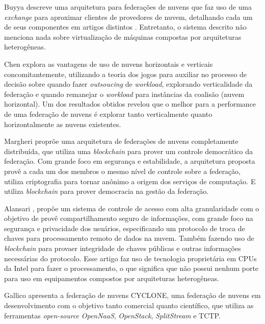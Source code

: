 
Buyya \cite{Buyya:2010:IUF:2143583.2143586} descreve uma arquitetura para federações de nuvens que faz uso de uma \textit{exchange} para aproximar clientes de provedores de nuvem, detalhando cada um de seus componentes em artigos distintos \cite{Calheiros:2012:CSE:2263483.2264538}\cite{Garg2013} \cite{4539666} \cite{6063003}. Entretanto, o sistema descrito não menciona nada sobre virtualização de máquinas compostas por arquiteturas heterogêneas.

Chen\cite{7835207} explora as vantagens de uso de nuvens horizontais e verticais concomitantemente, utilizando a teoria dos jogos para auxiliar no processo de decisão sobre quando fazer \textit{outsoucing} de \textit{workload}, explorando verticalidade da federação e quando remanejar o \textit{workload} para instâncias da coalisão (nuvem horizontal). Um dos resultados obtidos revelou que o melhor para a performance de uma federação de nuvens é explorar tanto verticalmente quanto horizontalmente as nuvens existentes.

Margheri \cite{FaaS_8030651} proprõe uma arquitetura de federações de nuvens completamente distribuída, que utiliza uma \textit{blockchain} para prover um controle democrático da federação. Com grande foco em segurança e estabilidade, a arquitetura proposta provê a cada um dos membros o mesmo nível de controle sobre a federação, utiliza criptografia para tornar anônimo a origem dos serviços de computação. E utiliza \textit{blockchain} para prover democracia na gestão da federação.

Alansari \cite{ACS_Federation_7980160}, propõe um sistema de controle de acesso com alta granularidade com o objetivo de provê compartilhamento seguro de informações, com grande foco na segurança e privacidade dos usuários, especificando um protocolo de troca de chaves para processamento remoto de dados na nuvem. Também fazendo uso de \textit{blockchain} para provaer integridade de chaves públicas e outras informações necessárias do protocolo. Esse artigo faz uso de tecnologia proprietária em \acrshort{CPU}s da Intel para fazer o processamento, o que significa que não possui nenhum porte para uso em equipamentos compostos por arquiteturas heterogêneas.

Gallico \cite{CYCLONE_7776591} apresenta a federação de nuvens CYCLONE, uma federação de nuvens em desenvolvimento com o objetivo tanto comercial quanto científico, que utiliza as ferramentas \textit{open-source} \textit{OpenNaaS}, \textit{OpenStack}, \textit{SplitStream} e \acrfull{TCTP}.

